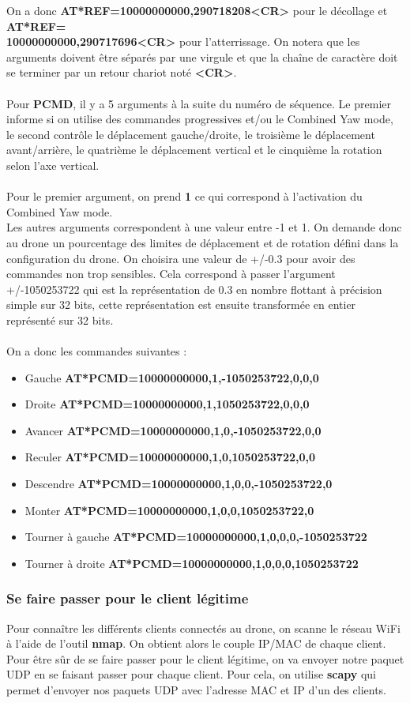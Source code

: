 On a donc \textbf{AT*REF=10000000000,290718208<CR>} pour le décollage et \textbf{AT*REF=}\\\textbf{10000000000,290717696<CR>} pour l'atterrissage. On notera que les arguments doivent être séparés par une virgule et que la chaîne de caractère doit se terminer par un retour chariot noté \textbf{<CR>}.\\\\
Pour \textbf{PCMD}, il y a 5 arguments à la suite du numéro de séquence. Le premier informe si on utilise des commandes progressives et/ou le Combined Yaw mode, le second contrôle le déplacement gauche/droite, le troisième le déplacement avant/arrière, le quatrième le déplacement vertical et le cinquième la rotation selon l'axe vertical.\\\\
Pour le premier argument, on prend \textbf{1} ce qui correspond à l'activation du Combined Yaw mode.\\
Les autres arguments correspondent à une valeur entre -1 et 1. On demande donc au drone un pourcentage des limites de déplacement et de rotation défini dans la configuration du drone. On choisira une valeur de +/-0.3 pour avoir des commandes non trop sensibles. Cela correspond à passer l'argument +/-1050253722 qui est la représentation de 0.3 en nombre flottant à précision simple sur 32 bits, cette représentation est ensuite transformée en entier représenté sur 32 bits.\\\\
On a donc les commandes suivantes :
\medbreak
\begin{itemize}
\item Gauche \textbf{AT*PCMD=10000000000,1,-1050253722,0,0,0}
\item Droite \textbf{AT*PCMD=10000000000,1,1050253722,0,0,0}
\item Avancer \textbf{AT*PCMD=10000000000,1,0,-1050253722,0,0}
\item Reculer \textbf{AT*PCMD=10000000000,1,0,1050253722,0,0}
\item Descendre \textbf{AT*PCMD=10000000000,1,0,0,-1050253722,0}
\item Monter \textbf{AT*PCMD=10000000000,1,0,0,1050253722,0}
\item Tourner à gauche \textbf{AT*PCMD=10000000000,1,0,0,0,-1050253722}
\item Tourner à droite \textbf{AT*PCMD=10000000000,1,0,0,0,1050253722}
\end{itemize}

\subsubsection{Se faire passer pour le client légitime}
Pour connaître les différents clients connectés au drone, on scanne le réseau WiFi à l'aide de l'outil \textbf{nmap}. On obtient alors le couple IP/MAC de chaque client. Pour être sûr de se faire passer pour le client légitime, on va envoyer notre paquet UDP en se faisant passer pour chaque client. Pour cela, on utilise \textbf{scapy} qui permet d'envoyer nos paquets UDP avec l'adresse MAC et IP d'un des clients.


